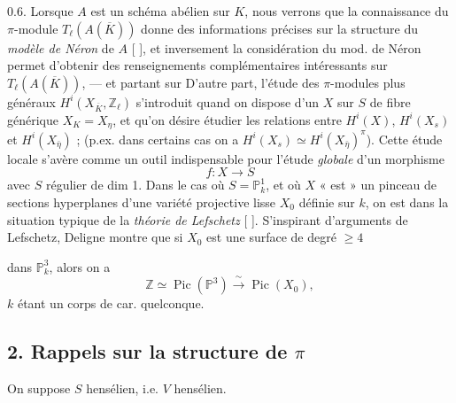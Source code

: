 \documentclass[11pt,a4paper]{article}
\begin{document}
0.6. Lorsque $A$ est un schéma abélien sur $K$, nous verrons que la connaissance du $\pi$-module $T_\ell(A(\overline{K}))$ donne des informations  précises sur la structure du \emph{modèle de Néron} de $A$ [ ], et inversement la considération du mod. de Néron permet d'obtenir des renseignements complémentaires intéressants sur $T_\ell(A(\overline{K}))$, --- et partant sur
D'autre part, l'étude des $\pi$-modules plus généraux $H^i(X_{\overline{K}}, \mathbb{Z}_\ell)$ s'introduit quand on \struck{\ill{}} dispose d'un   $X$ \struck{\ill{}} sur $S$ de fibre générique $X_K = X_\eta$, et qu'on désire \struck{\ill{}} étudier les relations entre $H^i(X)$, $H^i(X_s)$ et $H^i(X_{\bar\eta})$ ; (p.ex. dans certains cas on a $H^i(X_s) \simeq H^i(X_{\bar\eta})^{\pi}$). Cette   étude locale s'avère comme un outil indispensable pour l'étude  \emph{globale} d'un morphisme
\[
  f : X \longrightarrow S
\]
avec $S$ régulier de dim 1.  Dans le cas où $S = \mathbb{P}^1_k$, et où $X$ « est » \struck{\ill{}} un pinceau de sections hyperplanes d'une variété projective lisse $X_0$ définie sur $k$, on est dans la situation typique de la \emph{théorie de Lefschetz} [ ]. S'inspirant d'arguments de Lefschetz, Deligne montre  \struck{\ill{}} que si $X_0$ est une surface de degré ${}\geq 4$

dans $\mathbb{P}^3_k$, alors on a
\[
  \mathbb{Z} \simeq \operatorname{Pic}(\mathbb{P}^3) \xrightarrow{\ \sim\ } \operatorname{Pic}(X_0) ,
\]
$k$ étant un corps de car. quelconque.

\subsection*{2. Rappels sur la structure de $\pi$}

On suppose $S$ hensélien, i.e. $V$ hensélien.
\end{document}
